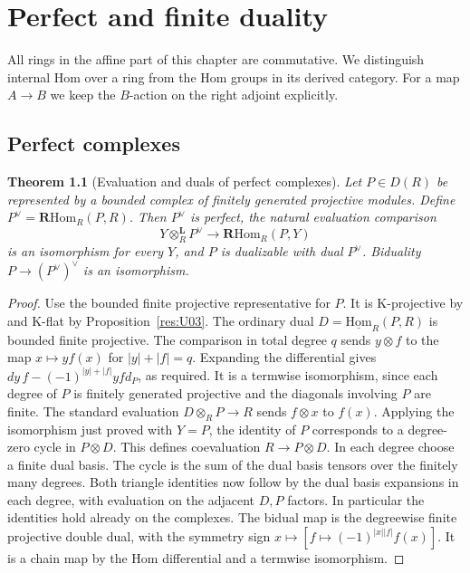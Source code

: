 \documentclass[11pt,oneside,openany]{book}
\newtheorem{theorem}{Theorem}[chapter]
\theoremstyle{definition}
\theoremstyle{remark}
\begin{document}
\chapter{Perfect and finite duality}
\label{ch:derived-duality}

All rings in the affine part of this chapter are commutative.
We distinguish internal Hom over a ring from the Hom groups in its
derived category. For a map \(A\to B\) we keep the \(B\)-action on
the right adjoint explicitly.

\section{Perfect complexes}

\begin{theorem}[Evaluation and duals of perfect complexes]\label{res:U10}
Let \(P\in D(R)\) be represented by a bounded complex of finitely
generated projective modules. Define
\(P^\vee=\mathbf R\mathrm{Hom}_R(P,R)\).
Then \(P^\vee\) is perfect, the natural evaluation comparison
\[
 Y\otimes_R^{\mathbf L}P^\vee
     \longrightarrow\mathbf R\mathrm{Hom}_R(P,Y)
\]
is an isomorphism for every \(Y\), and \(P\) is dualizable
with dual \(P^\vee\). Biduality \(P\to(P^\vee)^\vee\) is an
isomorphism.
\end{theorem}
\begin{proof}
Use the bounded finite projective representative for \(P\).
It is K-projective by \cite[R03]{ha-core} and K-flat by
Proposition~\ref{res:U03}. The ordinary dual
\(D=\underline{\mathrm{Hom}}_R(P,R)\) is bounded finite
projective. The comparison in total degree \(q\) sends
\(y\otimes f\) to the map \(x\mapsto y f(x)\) for
\(|y|+|f|=q\). Expanding the differential gives
\(d y\, f-(-1)^{|y|+|f|} y f d_P\), as required.
It is a termwise isomorphism, since each degree of \(P\)
is finitely generated projective and the diagonals involving
\(P\) are finite. The standard evaluation \(D\otimes_R P\to R\)
sends \(f\otimes x\) to \(f(x)\). Applying the isomorphism just
proved with \(Y=P\), the identity of \(P\) corresponds to a
degree-zero cycle in \(P\otimes D\). This defines coevaluation
\(R\to P\otimes D\). In each degree choose a finite dual basis.
The cycle is the sum of the dual basis tensors over the
finitely many degrees. Both triangle identities now follow
by the dual basis expansions in each degree, with evaluation
on the adjacent \(D,P\) factors. In particular the identities
hold already on the complexes. The bidual map is the
degreewise finite projective double dual, with the symmetry
sign \(x\mapsto[f\mapsto(-1)^{|x||f|}f(x)]\).
It is a chain map by the Hom differential and a
termwise isomorphism.
\end{proof}
\end{document}
